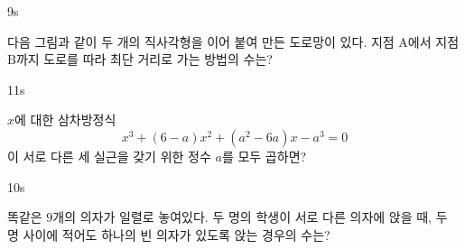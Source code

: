 \documentclass[10pt]{article}
\begin{document}
\begin{pagepair}
\noindent
\begin{minipage}[t][\probboxheight][t]{0.46\linewidth}
\begin{problem}{9}{s}
\par\smallskip
다음 그림과 같이 두 개의 직사각형을 이어 붙여 만든 도로망이 있다. 지점 $\mathrm{A}$에서 지점 $\mathrm{B}$까지 도로를 따라 최단 거리로 가는 방법의 수는?
\begin{center}
\end{center}
\begin{choices}
\end{choices}
\end{problem}
\end{minipage}\hfill
\begin{minipage}[t][\probboxheight][t]{0.46\linewidth}
\begin{problem}{11}{s}
\par\smallskip
$x$에 대한 삼차방정식
\[ x^3 + (6 - a)x^2 + (a^2 - 6a)x - a^3 = 0 \]
이 서로 다른 세 실근을 갖기 위한 정수 $a$를 모두 곱하면?
\begin{choices}
\end{choices}
\end{problem}
\end{minipage}
\par\vspace{4mm}
\noindent
\begin{minipage}[t][\probboxheight][t]{0.46\linewidth}
\begin{problem}{10}{s}
\par\smallskip
똑같은 $9$개의 의자가 일렬로 놓여있다. 두 명의 학생이 서로 다른 의자에 앉을 때, 두 명 사이에 적어도 하나의 빈 의자가 있도록 앉는 경우의 수는?
\begin{choices}
\end{choices}
\end{problem}

\end{minipage}
\end{pagepair}
\end{document}
